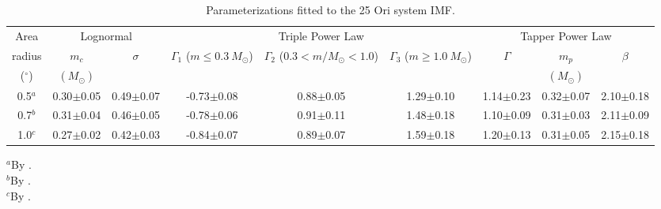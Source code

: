 \documentclass[12pt]{article}
\begin{document}
\begin{table}
\caption{Parameterizations fitted to the 25 Ori system IMF.}
  \scriptsize
  \label{tab_IMF:imf}
  \setlength{\tabcolsep}{5pt}
  \begin{threeparttable}
 	\begin{tabular}{@{\extracolsep{2pt}}ccccccccc@{}}
 	\hline
 	\hline
		Area           & \multicolumn{2}{c}{Lognormal} & \multicolumn{3}{c}{Triple Power Law}           & \multicolumn{3}{c}{Tapper Power Law} \\
   \cline{2-3}
   \cline{4-6}
   \cline{7-9}
        radius	    & $m_c$        & $\sigma$       & $\Gamma_1$ ($m\le0.3\ M_\odot$) & $\Gamma_2$ ($0.3<m/M_\odot<1.0$)  & $\Gamma_3$ ($m\ge1.0\ M_\odot$)  & $\Gamma$      & $m_p$         & $\beta$      \\
        ($^\circ$)  & $(M_\odot)$  &                &                               &                &               &               & $(M_\odot)$   &             \\
 	\hline
		0.5$^a$       & 0.30$\pm$0.05 & 0.49$\pm$0.07 & -0.73$\pm$0.08 & 0.88$\pm$0.05 & 1.29$\pm$0.10 & 1.14$\pm$0.23 & 0.32$\pm$0.07 & 2.10$\pm$0.18 \\
		0.7$^b$       & 0.31$\pm$0.04 & 0.46$\pm$0.05 & -0.78$\pm$0.06 & 0.91$\pm$0.11 & 1.48$\pm$0.18 & 1.10$\pm$0.09 & 0.31$\pm$0.03 & 2.11$\pm$0.09 \\
		1.0$^c$       & 0.27$\pm$0.02 & 0.42$\pm$0.03 & -0.84$\pm$0.07 & 0.89$\pm$0.07 & 1.59$\pm$0.18 & 1.20$\pm$0.13 & 0.31$\pm$0.05 & 2.15$\pm$0.18 \\
 	\hline
 	\end{tabular}
  \begin{tablenotes}
	$^a$By \citet{Downes2014}.\\
	$^b$By \citet{Briceno2005,Briceno2007}.\\
	$^c$By \citet{Briceno2018}.
  \end{tablenotes}
 \end{threeparttable}
\end{table}
\end{document}
